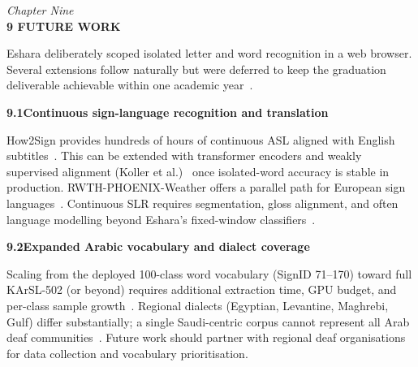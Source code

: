 \newpage
\thispagestyle{plain}

\begin{center}
    \vspace*{0.5cm}
    {\large \textit{Chapter Nine}} \\[0.4cm]
    {\Large \textbf{9 \quad FUTURE WORK}}
\end{center}
\vspace{0.45in}

\normalsize
{}

\noindent Eshara deliberately scoped isolated letter and word recognition in a web browser. Several extensions follow naturally but were deferred to keep the graduation deliverable achievable within one academic year~\cite{duarte2021how2sign,sidig2021karsl}.\par\vspace{0.3cm}

\noindent\textbf{9.1\quad Continuous sign-language recognition and translation}\par
{}
\vspace{0.2cm}

\noindent How2Sign provides hundreds of hours of continuous ASL aligned with English subtitles~\cite{duarte2021how2sign}. This can be extended with transformer encoders and weakly supervised alignment (Koller et al.)~\cite{koller2020weakly} once isolated-word accuracy is stable in production. RWTH-PHOENIX-Weather offers a parallel path for European sign languages~\cite{forster2014rwth}. Continuous SLR requires segmentation, gloss alignment, and often language modelling beyond Eshara's fixed-window classifiers~\cite{camgoz2018neural}.\par\vspace{0.3cm}

\noindent\textbf{9.2\quad Expanded Arabic vocabulary and dialect coverage}\par
{}
\vspace{0.2cm}

\noindent Scaling from the deployed 100-class word vocabulary (SignID 71--170) toward full KArSL-502 (or beyond) requires additional extraction time, GPU budget, and per-class sample growth~\cite{sidig2021karsl}. Regional dialects (Egyptian, Levantine, Maghrebi, Gulf) differ substantially; a single Saudi-centric corpus cannot represent all Arab deaf communities~\cite{who2024hearing}. Future work should partner with regional deaf organisations for data collection and vocabulary prioritisation.\par\vspace{0.3cm}

